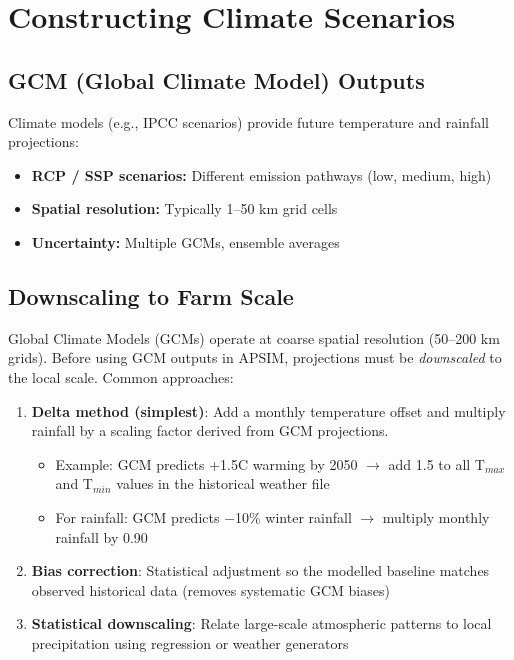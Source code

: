 \section{Constructing Climate Scenarios}

\subsection{GCM (Global Climate Model) Outputs}

Climate models (e.g., IPCC scenarios) provide future temperature and rainfall projections:
\begin{itemize}
  \item \textbf{RCP / SSP scenarios:} Different emission pathways (low, medium, high)
  \item \textbf{Spatial resolution:} Typically 1--50 km grid cells
  \item \textbf{Uncertainty:} Multiple GCMs, ensemble averages
\end{itemize}

\subsection{Downscaling to Farm Scale}

Global Climate Models (GCMs) operate at coarse spatial resolution (50--200 km grids). Before using GCM outputs in APSIM, projections must be \emph{downscaled} to the local scale. Common approaches:

\begin{enumerate}
  \item \textbf{Delta method (simplest)}: Add a monthly temperature offset and multiply rainfall by a scaling factor derived from GCM projections.
    \begin{itemize}
      \item Example: GCM predicts +1.5\textdegree C warming by 2050 $\to$ add 1.5 to all T$_{max}$ and T$_{min}$ values in the historical weather file
      \item For rainfall: GCM predicts $-$10\% winter rainfall $\to$ multiply monthly rainfall by 0.90
    \end{itemize}
  \item \textbf{Bias correction}: Statistical adjustment so the modelled baseline matches observed historical data (removes systematic GCM biases)
  \item \textbf{Statistical downscaling}: Relate large-scale atmospheric patterns to local precipitation using regression or weather generators
\end{enumerate}


